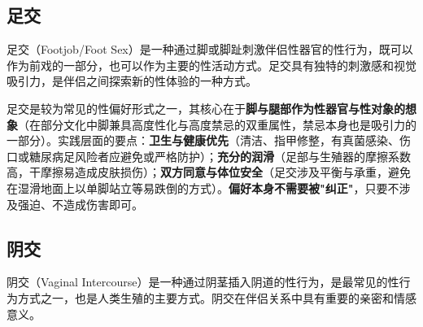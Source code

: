 \documentclass[12pt,UTF8]{ctexbook}
\begin{document}
\subsection{足交}

足交（Footjob/Foot Sex）是一种通过脚或脚趾刺激伴侣性器官的性行为，既可以作为前戏的一部分，也可以作为主要的性活动方式。足交具有独特的刺激感和视觉吸引力，是伴侣之间探索新的性体验的一种方式。


足交是较为常见的性偏好形式之一，其核心在于\textbf{脚与腿部作为性器官与性对象的想象}（在部分文化中脚兼具高度性化与高度禁忌的双重属性，禁忌本身也是吸引力的一部分）。实践层面的要点：\textbf{卫生与健康优先}（清洁、指甲修整，有真菌感染、伤口或糖尿病足风险者应避免或严格防护）；\textbf{充分的润滑}（足部与生殖器的摩擦系数高，干摩擦易造成皮肤损伤）；\textbf{双方同意与体位安全}（足交涉及平衡与承重，避免在湿滑地面上以单脚站立等易跌倒的方式）。\textbf{偏好本身不需要被"纠正"}，只要不涉及强迫、不造成伤害即可。

\subsection{阴交}

阴交（Vaginal Intercourse）是一种通过阴茎插入阴道的性行为，是最常见的性行为方式之一，也是人类生殖的主要方式。阴交在伴侣关系中具有重要的亲密和情感意义。
\end{document}
